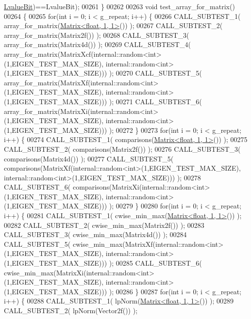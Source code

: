 \begin{DoxyCode}
      \hyperlink{group__flags_gae2c323957f20dfdc6cb8f44428eaec1a}{LvalueBit})==LvalueBit);
00261 \}
00262 
00263 \textcolor{keywordtype}{void} test\_array\_for\_matrix()
00264 \{
00265   \textcolor{keywordflow}{for}(\textcolor{keywordtype}{int} i = 0; i < g\_repeat; i++) \{
00266     CALL\_SUBTEST\_1( array\_for\_matrix(\hyperlink{group___core___module_class_eigen_1_1_matrix}{Matrix<float, 1, 1>}()) );
00267     CALL\_SUBTEST\_2( array\_for\_matrix(Matrix2f()) );
00268     CALL\_SUBTEST\_3( array\_for\_matrix(Matrix4d()) );
00269     CALL\_SUBTEST\_4( array\_for\_matrix(MatrixXcf(internal::random<int>(1,EIGEN\_TEST\_MAX\_SIZE), 
      internal::random<int>(1,EIGEN\_TEST\_MAX\_SIZE))) );
00270     CALL\_SUBTEST\_5( array\_for\_matrix(MatrixXf(internal::random<int>(1,EIGEN\_TEST\_MAX\_SIZE), 
      internal::random<int>(1,EIGEN\_TEST\_MAX\_SIZE))) );
00271     CALL\_SUBTEST\_6( array\_for\_matrix(MatrixXi(internal::random<int>(1,EIGEN\_TEST\_MAX\_SIZE), 
      internal::random<int>(1,EIGEN\_TEST\_MAX\_SIZE))) );
00272   \}
00273   \textcolor{keywordflow}{for}(\textcolor{keywordtype}{int} i = 0; i < g\_repeat; i++) \{
00274     CALL\_SUBTEST\_1( comparisons(\hyperlink{group___core___module_class_eigen_1_1_matrix}{Matrix<float, 1, 1>}()) );
00275     CALL\_SUBTEST\_2( comparisons(Matrix2f()) );
00276     CALL\_SUBTEST\_3( comparisons(Matrix4d()) );
00277     CALL\_SUBTEST\_5( comparisons(MatrixXf(internal::random<int>(1,EIGEN\_TEST\_MAX\_SIZE), 
      internal::random<int>(1,EIGEN\_TEST\_MAX\_SIZE))) );
00278     CALL\_SUBTEST\_6( comparisons(MatrixXi(internal::random<int>(1,EIGEN\_TEST\_MAX\_SIZE), 
      internal::random<int>(1,EIGEN\_TEST\_MAX\_SIZE))) );
00279   \}
00280   \textcolor{keywordflow}{for}(\textcolor{keywordtype}{int} i = 0; i < g\_repeat; i++) \{
00281     CALL\_SUBTEST\_1( cwise\_min\_max(\hyperlink{group___core___module_class_eigen_1_1_matrix}{Matrix<float, 1, 1>}()) );
00282     CALL\_SUBTEST\_2( cwise\_min\_max(Matrix2f()) );
00283     CALL\_SUBTEST\_3( cwise\_min\_max(Matrix4d()) );
00284     CALL\_SUBTEST\_5( cwise\_min\_max(MatrixXf(internal::random<int>(1,EIGEN\_TEST\_MAX\_SIZE), 
      internal::random<int>(1,EIGEN\_TEST\_MAX\_SIZE))) );
00285     CALL\_SUBTEST\_6( cwise\_min\_max(MatrixXi(internal::random<int>(1,EIGEN\_TEST\_MAX\_SIZE), 
      internal::random<int>(1,EIGEN\_TEST\_MAX\_SIZE))) );
00286   \}
00287   \textcolor{keywordflow}{for}(\textcolor{keywordtype}{int} i = 0; i < g\_repeat; i++) \{
00288     CALL\_SUBTEST\_1( lpNorm(\hyperlink{group___core___module_class_eigen_1_1_matrix}{Matrix<float, 1, 1>}()) );
00289     CALL\_SUBTEST\_2( lpNorm(Vector2f()) );

\end{DoxyCode}
